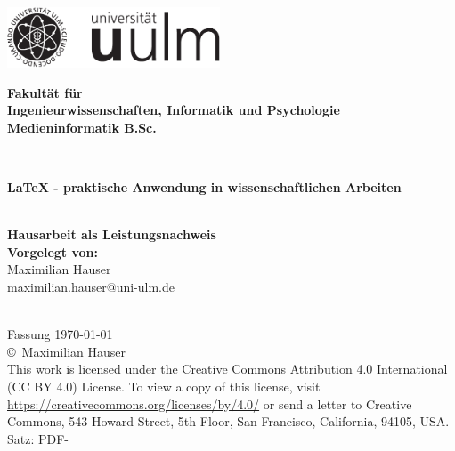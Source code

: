 \documentclass[a4paper,12pt,
headsepline,           %
oneside,               %
pointlessnumbers,      %
bibtotoc,              %
BCOR15mm               %
]{scrbook}
\makeatletter
\newcommand{\fullname}{Maximilian Hauser}
\newcommand{\email}{maximilian.hauser@uni-ulm.de}
\newcommand{\titel}{LaTeX - praktische Anwendung in wissenschaftlichen Arbeiten}
\newcommand{\fakultaet}{Ingenieurwissenschaften, Informatik und Psychologie}
\newcommand{\institut}{Medieninformatik B.Sc.}
\makeatother
\begin{document}
\frontmatter

\thispagestyle{empty}
\begin{addmargin*}[4mm]{-10mm}

\hfill
\includegraphics[height=1.8cm]{rohmaterial-bilder/Logo_uulm_Vorlage_100mm_schwarz.pdf}\\[-1.25em]

{\footnotesize
\hspace*{115mm}\parbox[t]{35mm}{\bfseries Fakultät für\\
\fakultaet\\
\mdseries \institut}\\[2cm]

\parbox{140mm}{\bfseries \LARGE \titel}\\[2.5em]
{\bfseries \LARGE Hausarbeit als Leistungsnachweis}\\[5em]

{\footnotesize \bfseries Vorgelegt von:}\\
{\footnotesize \fullname\\ \email}\\ \\[2em]
}
\end{addmargin*}


\clearpage
\thispagestyle{empty}
{ \small
  \flushleft
  Fassung \today \\\vfill
  \copyright~\fullname\\[0.5em]
This work is licensed under the Creative Commons Attribution 4.0 International (CC BY 4.0) License. To view a copy of this license, visit \href{https://creativecommons.org/licenses/by/4.0/}{https://creativecommons.org/licenses/by/4.0/} or send a letter to Creative Commons, 543 Howard Street, 5th Floor, San Francisco, California, 94105, USA. \\
  Satz: PDF-\LaTeXe
}
\end{document}
